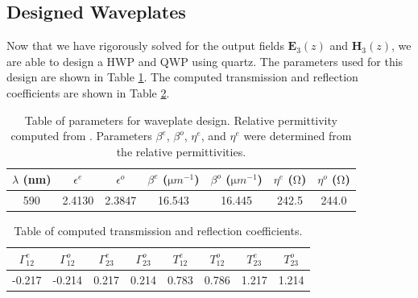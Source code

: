 \documentclass{optica-article}
\newcommand{\bv}[1]{\mathbf{#1}}
\begin{document}
\subsection{Designed Waveplates}
Now that we have rigorously solved for the output fields $\bv{E}_3(z)$ and 
$\bv{H}_3(z)$, we are able to design a HWP and QWP using quartz. The 
parameters used for this design are shown in Table \ref{tb:param_1}. The 
computed transmission and reflection coefficients are shown in Table 
\ref{tb:param_2}.

\begin{table}[htbp]
  \centering
  \begin{tabular}{ccccccc}
    $\lambda$ (nm) & $\epsilon^e$ & $\epsilon^o$ & 
    $\beta^e$ ($\si{\micro m}^{-1}$) & $\beta^o$ ($\si{\micro m}^{-1}$)
    & $\eta^e$ ($\si{\ohm}$) & $\eta^o$ ($\si{\ohm}$)\\
    \hline\hline
    590 & 2.4130 & 2.3847 & 16.543 & 16.445 & 242.5 & 244.0\\
  \end{tabular}
  \caption{Table of parameters for waveplate design. Relative permittivity
  computed from \cite{GHOSH199995}. Parameters $\beta^e$, $\beta^o$, $\eta^e$, 
  and   $\eta^e$ were determined from the relative permittivities.}
  \label{tb:param_1}
\end{table}
\begin{table}[htbp]
  \centering
  \begin{tabular}{cccccccc}
    $\Gamma_{12}^e$ & $\Gamma_{12}^o$ & $\Gamma_{23}^e$ & $\Gamma_{23}^o$ &
    $T_{12}^e$ & $T_{12}^o$ & $T_{23}^e$ & $T_{23}^o$\\ \hline\hline
    -0.217 & -0.214 & 0.217 & 0.214 & 0.783 & 0.786 & 1.217 & 1.214\\
  \end{tabular}
  \caption{Table of computed transmission and reflection coefficients.}
  \label{tb:param_2}
\end{table}
\end{document}
